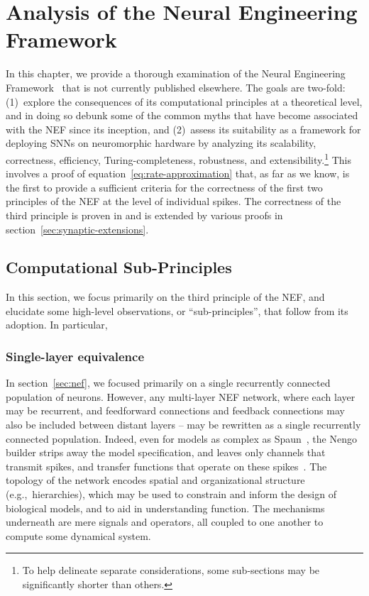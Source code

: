 \chapter{Analysis of the Neural Engineering Framework}
\label{chapt:analysis}

In this chapter, we provide a thorough examination of the Neural Engineering Framework~\citep[NEF;][]{eliasmith2003a} that is not currently published elsewhere.
The goals are two-fold: (1)~explore the consequences of its computational principles at a theoretical level, and in doing so debunk some of the common myths that have become associated with the NEF since its inception, and (2)~assess its suitability as a framework for deploying SNNs on neuromorphic hardware by analyzing its scalability, correctness, efficiency, Turing-completeness, robustness, and extensibility.\footnote{
To help delineate separate considerations, some sub-sections may be significantly shorter than others.
}
This involves a proof of equation~\ref{eq:rate-approximation} that, as far as we know, is the first to provide a sufficient criteria for the correctness of the first two principles of the NEF at the level of individual spikes.
The correctness of the third principle is proven in \citet[][pp.~221--225]{eliasmith2003a} and is extended by various proofs in section~\ref{sec:synaptic-extensions}.

\section{Computational Sub-Principles}

In this section, we focus primarily on the third principle of the NEF, and elucidate some high-level observations, or ``sub-principles'', that follow from its adoption.
In particular, 

\subsection{Single-layer equivalence}

In section~\ref{sec:nef}, we focused primarily on a single recurrently connected population of neurons.
However, any multi-layer NEF network, where each layer may be recurrent, and feedforward connections and feedback connections may also be included between distant layers -- may be rewritten as a single recurrently connected population.
Indeed, even for models as complex as Spaun~\citep{eliasmith2012, choo2018}, the Nengo builder strips away the model specification, and leaves only channels that transmit spikes, and transfer functions that operate on these spikes~\citep{bekolay2014, gosmann2017automatic}.
The topology of the network encodes spatial and organizational structure (e.g.,~hierarchies), which may be used to constrain and inform the design of biological models, and to aid in understanding function.
The mechanisms underneath are mere signals and operators, all coupled to one another to compute some dynamical system.

